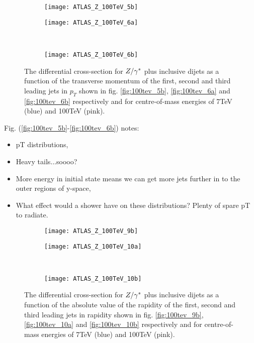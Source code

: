 	\begin{figure}[bth]
		\centering
		\begin{subfigure}[b]{0.48\textwidth}
			\texttt{[image: ATLAS\_Z\_100TeV\_5b]}
			\caption{}
			\label{fig:100tev_5b}
		\end{subfigure}

		\begin{subfigure}[b]{0.48\textwidth}
			\texttt{[image: ATLAS\_Z\_100TeV\_6a]}
			\caption{}
			\label{fig:100tev_6a}
		\end{subfigure}
		~
		\begin{subfigure}[b]{0.48\textwidth}
			\texttt{[image: ATLAS\_Z\_100TeV\_6b]}
			\caption{}
			\label{fig:100tev_6b}
		\end{subfigure}
		\caption{The differential cross-section for $Z/\gamma^*$ plus inclusive dijets as a function of the transverse momentum
		         of the first, second and third leading jets in $p_T$ shown in fig. \eqref{fig:100tev_5b}, \eqref{fig:100tev_6a}
		         and \eqref{fig:100tev_6b} respectively and for centre-of-mass energies of 7TeV (blue) and 100TeV (pink).}
	\end{figure}

	Fig. (\eqref{fig:100tev_5b}-\eqref{fig:100tev_6b}) notes:

	\begin{itemize}
		\item pT distributions,
		\item Heavy tails...soooo?
		\item More energy in initial state means we can get more jets further in to the outer regions of y-space,
		\item What effect would a shower have on these distributions?  Plenty of spare pT to radiate.
	\end{itemize}

	\begin{figure}[bth]
		\centering
		\begin{subfigure}[b]{0.48\textwidth}
			\texttt{[image: ATLAS\_Z\_100TeV\_9b]}
			\caption{}
			\label{fig:100tev_9b}
		\end{subfigure}

		\begin{subfigure}[b]{0.48\textwidth}
			\texttt{[image: ATLAS\_Z\_100TeV\_10a]}
			\caption{}
			\label{fig:100tev_10a}
		\end{subfigure}
		~
		\begin{subfigure}[b]{0.48\textwidth}
			\texttt{[image: ATLAS\_Z\_100TeV\_10b]}
			\caption{}
			\label{fig:100tev_10b}
		\end{subfigure}
		\caption{The differential cross-section for $Z/\gamma^*$ plus inclusive dijets as a function of the absolute value of the rapidity
		         of the first, second and third leading jets in rapidity shown in fig. \eqref{fig:100tev_9b}, \eqref{fig:100tev_10a}
		         and \eqref{fig:100tev_10b} respectively and for centre-of-mass energies of 7TeV (blue) and 100TeV (pink).}
	\end{figure}

